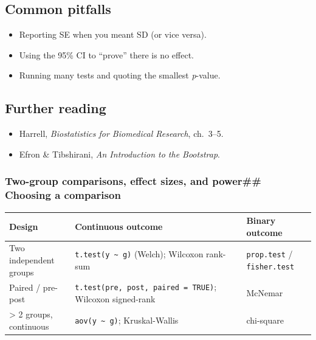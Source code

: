 \documentclass[
]{article}
\newcounter{none} %
\providecommand{\tightlist}{%
  \setlength{\itemsep}{0pt}\setlength{\parskip}{0pt}}
\begin{document}
\subsection{Common pitfalls}\label{common-pitfalls-2}

\begin{itemize}
\tightlist
\item
  Reporting SE when you meant SD (or vice versa).
\item
  Using the 95\% CI to ``prove'' there is no effect.
\item
  Running many tests and quoting the smallest \emph{p}-value.
\end{itemize}

\subsection{Further reading}\label{further-reading-2}

\begin{itemize}
\tightlist
\item
  Harrell, \emph{Biostatistics for Biomedical Research}, ch.~3--5.
\item
  Efron \& Tibshirani, \emph{An Introduction to the Bootstrap}.
\end{itemize}

\subsubsection{Two-group comparisons, effect sizes, and power\#\#
Choosing a
comparison}\label{two-group-comparisons-effect-sizes-and-power-choosing-a-comparison}

{\def\LTcaptype{none} %
\begin{longtable}[]{@{}
  >{\raggedright\arraybackslash}p{}
  >{\raggedright\arraybackslash}p{}
  >{\raggedright\arraybackslash}p{}@{}}
\toprule\noalign{}
\begin{minipage}[b]{\linewidth}\raggedright
Design
\end{minipage} & \begin{minipage}[b]{\linewidth}\raggedright
Continuous outcome
\end{minipage} & \begin{minipage}[b]{\linewidth}\raggedright
Binary outcome
\end{minipage} \\
\midrule\noalign{}
\endhead
\bottomrule\noalign{}
\endlastfoot
Two independent groups & \texttt{t.test(y\ \textasciitilde{}\ g)}
(Welch); Wilcoxon rank-sum & \texttt{prop.test} /
\texttt{fisher.test} \\
Paired / pre-post & \texttt{t.test(pre,\ post,\ paired\ =\ TRUE)};
Wilcoxon signed-rank & McNemar \\
\textgreater{} 2 groups, continuous &
\texttt{aov(y\ \textasciitilde{}\ g)}; Kruskal-Wallis & chi-square \\
\end{longtable}
}
\end{document}
